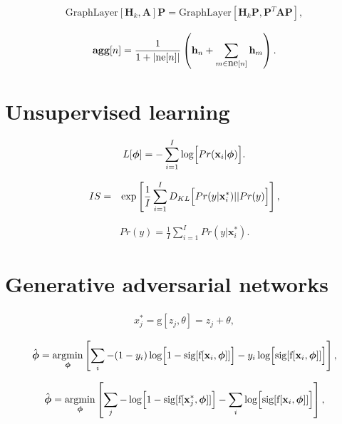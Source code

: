 \documentclass[letterpaper,twoside,openany, titlepage,oldfontcommands,titles,dvipsnames]{memoir}
\begin{document}
\begin{eqnarray}
 \mbox{GraphLayer}[\mathbf{H}_{k},\mathbf{A}]\mathbf{P} = \mbox{GraphLayer}[\mathbf{H}_{k}\mathbf{P},\mathbf{P}^{T}\mathbf{A}\mathbf{P}],
 \end{eqnarray}

\begin{eqnarray}
 \mbox{\bf agg}[n] = \frac{1}{1+|\mbox{ne}[n]|}\left(\mathbf{h}_{n}+\sum_{m\in\mbox{ne}[n]}\mathbf{h}_{m}\right).
 \end{eqnarray}

 \chapter{Unsupervised learning}

\begin{eqnarray}
  L[\boldsymbol\phi] = -\sum_{i=1}^{I}\log\Bigl[Pr(\mathbf{x}_{i}|\boldsymbol\phi)\Bigr].
 \end{eqnarray}

\begin{eqnarray}
 IS &=& \exp\left[\frac{1}{I}\sum_{i=1}^{I}D_{KL}\Bigl[Pr(y|\mathbf{x}^*_{i})||Pr(y) \Bigr]\right],
 \end{eqnarray}

\begin{eqnarray}
 Pr(y) = \frac{1}{I}\sum_{i=1}^I Pr(y|\mathbf{x}^*_i).
 \end{eqnarray}

\chapter{Generative adversarial networks}

\begin{eqnarray}
  x_j^{*}= \mbox{g}[z_j,\theta] = z_j+\theta,
 \end{eqnarray}

\begin{eqnarray}
 \hat{\boldsymbol\phi} = \mathop{\rm argmin}_{\boldsymbol\phi} \left[\sum_{i}-(1-y_{i})\log\Bigl[1-\mbox{sig}[\mbox{f}[\mathbf{x}_i,\boldsymbol\phi]]\Bigr] - y_{i}\log\Bigl[\mbox{sig}[\mbox{f}[\mathbf{x}_i,\boldsymbol\phi]]\Bigr]\right],
 \end{eqnarray}

\begin{eqnarray}\label{eq:gan_cost_fun_sum0}
 \hat{\boldsymbol\phi} = \mathop{\rm argmin}_{\boldsymbol\phi} \left[\sum_{j}-\log\Bigl[1-\mbox{sig}[\mbox{f}[\mathbf{x}^*_j,\boldsymbol\phi]]\Bigr] - \sum_{i}\log\Bigl[\mbox{sig}[\mbox{f}[\mathbf{x}_i,\boldsymbol\phi]]\Bigr]\right],
 \end{eqnarray}
\end{document}
